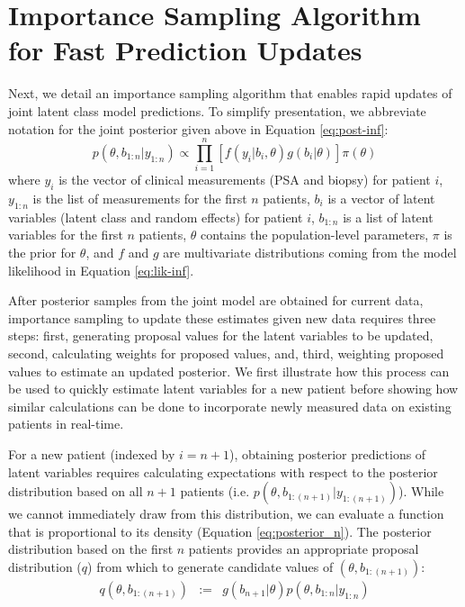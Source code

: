 \documentclass[letterpaper]{article}
\begin{document}
\section{Importance Sampling Algorithm for Fast Prediction Updates}
Next, we detail an importance sampling algorithm that enables rapid updates of joint latent class model predictions. To simplify presentation, we abbreviate notation for the joint posterior given above in Equation \ref{eq:post-inf}: 
\begin{equation}
p(\theta,b_{1:n}|y_{1:n})\propto\prod_{i=1}^{n}[f(y_{i}|b_{i},\theta)g(b_{i}|\theta)]\pi(\theta)\label{eq:posterior_n}
\end{equation}
where $y_{i}$ is the vector of clinical measurements (PSA and biopsy) for patient $i$, $y_{1:n}$ is the list of measurements for the first $n$ patients, $b_{i}$ is a vector of latent variables (latent class and random effects) for patient $i$, $b_{1:n}$ is a list of latent variables for the first $n$ patients, $\theta$ contains the population-level parameters, $\pi$ is the prior for $\theta$, and $f$ and $g$ are multivariate distributions coming from the model likelihood in Equation \ref{eq:lik-inf}.

After posterior samples from the joint model are obtained for current data, importance sampling to update these estimates given new data requires three steps: first, generating proposal values for the latent variables to be updated, second, calculating weights for proposed values, and, third, weighting proposed values to estimate an updated posterior. We first illustrate how this process can be used to quickly estimate latent variables for a new patient before showing how similar calculations can be done to incorporate newly measured data on existing patients in real-time.

For a new patient (indexed by $i=n+1$), obtaining posterior predictions of latent variables requires calculating expectations with respect to the posterior distribution based on all $n+1$ patients (i.e. $p(\theta,b_{1:(n+1)}|y_{1:(n+1)})$). While we cannot immediately draw from this distribution, we can evaluate a function that is proportional to its density (Equation \ref{eq:posterior_n}). The posterior distribution based on the first $n$ patients provides an appropriate proposal distribution ($q$) from which to generate candidate values of $(\theta,b_{1:(n+1)})$: 
\begin{eqnarray*}
q(\theta,b_{1:(n+1)}) & := & g(b_{n+1}|\theta)p(\theta,b_{1:n}|y_{1:n})
\end{eqnarray*}
\end{document}
